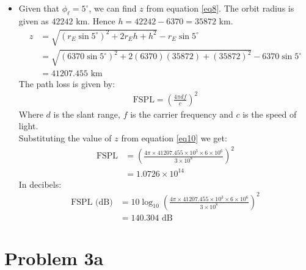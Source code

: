 \documentclass[titlepage]{article}
\begin{document}
\begin{itemize}
    \item Given that $\phi_{\ell} = 5 ^{\circ}$, we can find $z$ from equation \ref{eq8}. The orbit radius is given as $42242$ km. Hence $h = 42242-6370 = 35872$ km.
          \begin{align}
              z & = \sqrt{(r_E\sin 5^{\circ})^2+2r_Eh+h^2}-r_E\sin 5^{\circ}  \nonumber                 \\
                & = \sqrt{(6370\sin 5^{\circ})^2+2(6370)(35872)+(35872)^2}-6370\sin 5^{\circ} \nonumber \\
                & = 41207.455 \text{ km} \label{eq10}
          \end{align}
          The path loss is given by:
          \begin{align}
              \text{FSPL} = \left(\frac{4\pi d f}{c}\right)^2 \label{eq11}
          \end{align}
          Where $d$ is the slant range, $f$ is the carrier frequency and $c$ is the speed of light.\\
          Substituting the value of $z$ from equation \ref{eq10} we get:
          \begin{align}
              \text{FSPL} & = \left(\frac{4\pi\times 41207.455\times10^3\times 6 \times 10^6}{3\times 10^8 }\right)^2 \nonumber \\
                          & = 1.0726 \times 10^{14}
          \end{align}
          In decibels:
          \begin{align}
              \text{FSPL (dB)} & = 10\log_{10} \left(\frac{4\pi\times 41207.455\times10^3\times 6 \times 10^6}{3\times 10^8 }\right)^2 \nonumber \\
                               & = 140.304 \text{ dB}
          \end{align}

\end{itemize}

\newpage

\section {Problem 3a}
\end{document}
